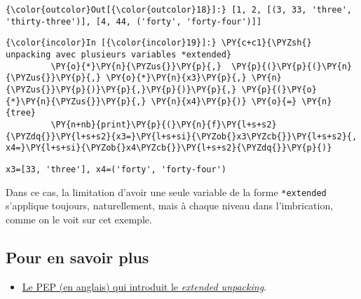\begin{Verbatim}[commandchars=\\\{\}]
{\color{outcolor}Out[{\color{outcolor}18}]:} [1, 2, [(3, 33, 'three', 'thirty-three')], [4, 44, ('forty', 'forty-four')]]
\end{Verbatim}
            
    \begin{Verbatim}[commandchars=\\\{\}]
{\color{incolor}In [{\color{incolor}19}]:} \PY{c+c1}{\PYZsh{} unpacking avec plusieurs variables *extended}
         \PY{o}{*}\PY{n}{\PYZus{}}\PY{p}{,}  \PY{p}{(}\PY{p}{(}\PY{n}{\PYZus{}}\PY{p}{,} \PY{o}{*}\PY{n}{x3}\PY{p}{,} \PY{n}{\PYZus{}}\PY{p}{)}\PY{p}{,}\PY{p}{)}\PY{p}{,} \PY{p}{(}\PY{o}{*}\PY{n}{\PYZus{}}\PY{p}{,} \PY{n}{x4}\PY{p}{)} \PY{o}{=} \PY{n}{tree}
         \PY{n+nb}{print}\PY{p}{(}\PY{n}{f}\PY{l+s+s2}{\PYZdq{}}\PY{l+s+s2}{x3=}\PY{l+s+si}{\PYZob{}x3\PYZcb{}}\PY{l+s+s2}{, x4=}\PY{l+s+si}{\PYZob{}x4\PYZcb{}}\PY{l+s+s2}{\PYZdq{}}\PY{p}{)}
\end{Verbatim}


    \begin{Verbatim}[commandchars=\\\{\}]
x3=[33, 'three'], x4=('forty', 'forty-four')

    \end{Verbatim}

    Dans ce cas, la limitation d'avoir une seule variable de la forme
\texttt{*extended} s'applique toujours, naturellement, mais à chaque
niveau dans l'imbrication, comme on le voit sur cet exemple.

    \hypertarget{pour-en-savoir-plus}{%
\subsection{Pour en savoir plus}\label{pour-en-savoir-plus}}

\begin{itemize}
\tightlist
\item
  \href{https://www.python.org/dev/peps/pep-3132/}{Le PEP (en anglais)
  qui introduit le \emph{extended unpacking}}.
\end{itemize}


    
    
    
